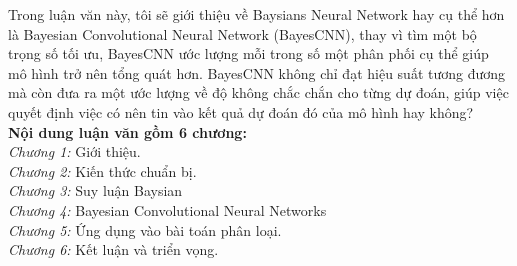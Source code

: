 Trong luận văn này, tôi sẽ giới thiệu về Baysians Neural Network hay cụ thể hơn là Bayesian Convolutional Neural Network (BayesCNN), thay vì tìm một bộ trọng số tối ưu, BayesCNN ước lượng mỗi trong số một phân phối cụ thể giúp mô hình trở nên tổng quát hơn. BayesCNN không chỉ đạt hiệu suất tương đương mà còn đưa ra một ước lượng về độ không chắc chắn cho từng dự đoán, giúp việc quyết định việc có nên tin vào kết quả dự đoán đó của mô hình hay không?\\
\textbf{Nội dung luận văn gồm 6 chương:}\\
	\textit{Chương 1:} Giới thiệu.\\
	\textit{Chương 2:} Kiến thức chuẩn bị.\\
	\textit{Chương 3:} Suy luận Baysian\\
	\textit{Chương 4:} Bayesian Convolutional Neural Networks\\
	\textit{Chương 5:} Ứng dụng vào bài toán phân loại.\\
	\textit{Chương 6:} Kết luận và triển vọng.\\